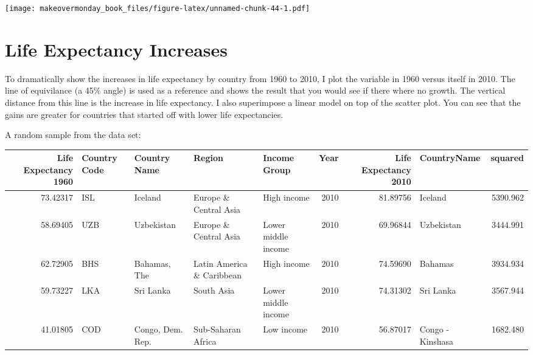 \documentclass[]{book}
\theoremstyle{definition}
\theoremstyle{definition}
\theoremstyle{definition}
\theoremstyle{remark}
\begin{document}
\texttt{[image: makeovermonday\_book\_files/figure-latex/unnamed-chunk-44-1.pdf]}

\chapter{Life Expectancy Increases}\label{life-expectancy-increases}

To dramatically show the increases in life expectancy by country from
1960 to 2010, I plot the variable in 1960 versus itself in 2010. The
line of equivilance (a 45\% angle) is used as a reference and shows the
result that you would see if there where no growth. The vertical
distance from this line is the increase in life expectancy. I also
superimpose a linear model on top of the scatter plot. You can see that
the gains are greater for countries that started off with lower life
expectancies.

A random sample from the data set:

\begin{tabular}{r|l|l|l|l|r|r|l|r}
\hline
Life Expectancy 1960 & Country Code & Country Name & Region & Income Group & Year & Life Expectancy 2010 & CountryName & squared\\
\hline
73.42317 & ISL & Iceland & Europe \& Central Asia & High income & 2010 & 81.89756 & Iceland & 5390.962\\
\hline
58.69405 & UZB & Uzbekistan & Europe \& Central Asia & Lower middle income & 2010 & 69.96844 & Uzbekistan & 3444.991\\
\hline
62.72905 & BHS & Bahamas, The & Latin America \& Caribbean & High income & 2010 & 74.59690 & Bahamas & 3934.934\\
\hline
59.73227 & LKA & Sri Lanka & South Asia & Lower middle income & 2010 & 74.31302 & Sri Lanka & 3567.944\\
\hline
41.01805 & COD & Congo, Dem. Rep. & Sub-Saharan Africa & Low income & 2010 & 56.87017 & Congo - Kinshasa & 1682.480\\
\hline
\end{tabular}
\end{document}
